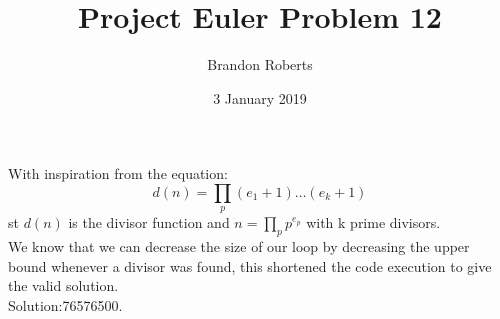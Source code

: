 \documentclass{article}
\begin{document}
\title{Project Euler Problem 12}
\author{Brandon Roberts}
\date{3 January 2019}

\maketitle

With inspiration from the equation:
\begin{equation}
d(n)=\prod_{p} (e_1+1)\dots(e_k+1)
\end{equation}
st $d(n)$ is the divisor function and $n=\prod_{p} p^{e_p}$ with k prime divisors.\\
We know that we can decrease the size of our loop by decreasing the upper bound whenever a divisor was found, this shortened the code execution to give the valid solution.\\
Solution:76576500.
\end{document}
